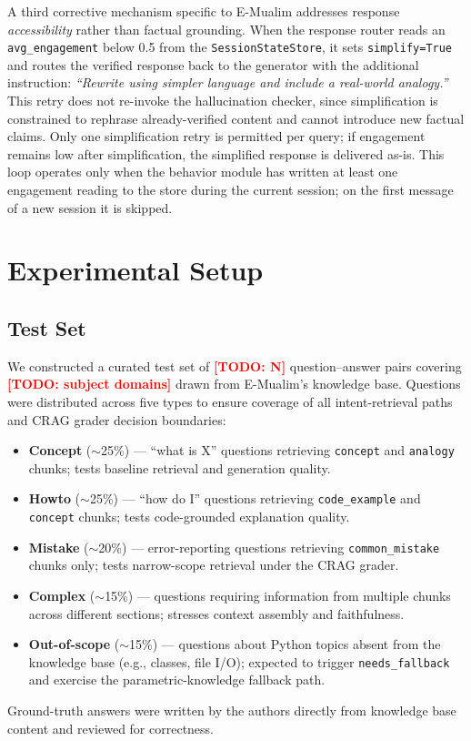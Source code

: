 \documentclass[conference]{IEEEtran}
\newcommand{\todo}[1]{\textcolor{red}{\textbf{[TODO: #1]}}}
\begin{document}
A third corrective mechanism specific to E-Mualim addresses response
\emph{accessibility} rather than factual grounding.
When the response router reads an \texttt{avg\_engagement} below 0.5
from the \texttt{SessionStateStore}, it sets \texttt{simplify=True}
and routes the verified response back to the generator with the
additional instruction: \emph{``Rewrite using simpler language and
include a real-world analogy.''}
This retry does not re-invoke the hallucination checker, since
simplification is constrained to rephrase already-verified content
and cannot introduce new factual claims.
Only one simplification retry is permitted per query; if engagement
remains low after simplification, the simplified response is delivered
as-is.
This loop operates only when the behavior module has written at least
one engagement reading to the store during the current session;
on the first message of a new session it is skipped.

\section{Experimental Setup}
\label{sec:experiments}

\subsection{Test Set}

We constructed a curated test set of \todo{N} question--answer pairs
covering \todo{subject domains} drawn from E-Mualim's knowledge base.
Questions were distributed across five types to ensure coverage of
all intent-retrieval paths and CRAG grader decision boundaries:

\begin{itemize}
  \item \textbf{Concept} ($\sim$25\%) --- ``what is X'' questions
        retrieving \texttt{concept} and \texttt{analogy} chunks;
        tests baseline retrieval and generation quality.
  \item \textbf{Howto} ($\sim$25\%) --- ``how do I'' questions
        retrieving \texttt{code\_example} and \texttt{concept} chunks;
        tests code-grounded explanation quality.
  \item \textbf{Mistake} ($\sim$20\%) --- error-reporting questions
        retrieving \texttt{common\_mistake} chunks only; tests
        narrow-scope retrieval under the CRAG grader.
  \item \textbf{Complex} ($\sim$15\%) --- questions requiring
        information from multiple chunks across different sections;
        stresses context assembly and faithfulness.
  \item \textbf{Out-of-scope} ($\sim$15\%) --- questions about
        Python topics absent from the knowledge base (e.g., classes,
        file I/O); expected to trigger \texttt{needs\_fallback} and
        exercise the parametric-knowledge fallback path.
\end{itemize}
Ground-truth answers were written by the authors directly from
knowledge base content and reviewed for correctness.
\end{document}
